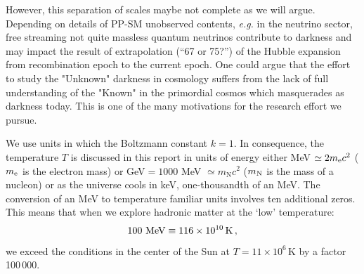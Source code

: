 However, this separation of scales maybe not complete as we will argue. Depending on details of PP-SM unobserved contents, {\it e.g.\/} in the neutrino sector, free streaming not quite massless quantum neutrinos contribute to darkness and may impact the result of extrapolation (``67 or 75?'') of the Hubble expansion from recombination epoch to the current epoch. One could argue that the effort to study the "Unknown" darkness in cosmology suffers from the lack of full understanding of the "Known" in the primordial cosmos which masquerades as darkness today. This is one of the many motivations for the research effort we pursue. 


We use units in which the Boltzmann constant $k=1$. In consequence, the temperature $T$ is discussed in this report in units of energy either MeV $\simeq 2 m_{\rm e} c^2$ ($m_{\rm e}$ is the electron mass) or GeV$= 1000$ MeV $\simeq m_{\mathrm N} c^2$ ($m_{\rm N}$ is the mass of a nucleon) or as the universe cools in keV, one-thousandth of an MeV. The conversion of an MeV to temperature familiar units involves ten additional zeros. This means that when we explore hadronic matter at the `low' temperature: 
\begin{equation} \label{tempval}
100\text{ MeV}\equiv 116\times 10^{10}\,\mathrm{K}\, ,
\end{equation}
we exceed the conditions in the center of the Sun at $T=11\times 10^6$\,K by a factor 100\,000. 

